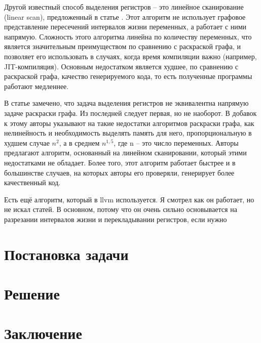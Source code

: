 \documentclass[a4paper,14pt]{extarticle}
\begin{document}
Другой известный способ выделения регистров -- это линейное сканирование (linear scan), предложенный в статье \cite{poletto_linear_1999}.
Этот алгоритм не использует графовое представление пересечений интервалов жизни переменных, а работает с ними напрямую.
Сложность этого алгоритма линейна по количеству переменных, что является значительным преимуществом по сравнению с раскраской графа,
и позволяет его использовать в случаях, когда время компиляции важно (например, JIT-компиляция).
Основным недостатком является худшее, по сравнению с раскраской графа, качество генерируемого кода, то есть полученные программы работают медленнее.

В статье \cite{krishnamurthi_extended_2007} замечено, что задача выделения регистров не эквивалентна напрямую задаче раскраски графа.
Из последней следует первая, но не наоборот.
В добавок к этому авторы указывают на такие недостатки алгоритмов раскраски графа,
как нелинейность и необходимость выделять память для него,
пропорциональную в худшем случае $n^2$, а в среднем $n^{1,5}$, где n -- это число переменных.
Авторы предлагают алгоритм, основанный на линейном сканировании, который этими недостатками не обладает.
Более того, этот алгоритм работает быстрее и в большинстве случаев, на которых авторы его проверяли, генерирует более качественный код.

{\color{red}
    Есть ещё алгоритм, который в llvm используется.
    Я смотрел как он работает, но не искал статей.
    В основном, потому что он очень сильно основывается на разрезании интервалов жизни и перекладывании регистров, если нужно
}

\section{Постановка задачи}

\section{Решение}

\section{Заключение}

\newpage



\end{document}
